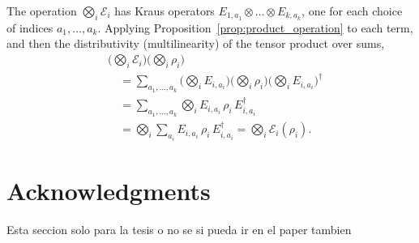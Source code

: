 \documentclass{ieeeaccess}
\begin{document}
\begin{IEEEproof}
  The operation $\bigotimes_i \mathcal{E}_i$ has Kraus operators $E_{1,a_1} \otimes \dots \otimes E_{k,a_k}$, one for each choice of indices $a_1, \dots, a_k$. Applying Proposition~\ref{prop:product_operation} to each term, and then the distributivity (multilinearity) of the tensor product over sums,
  \begin{align*}
    &\Big(\bigotimes_{i} \mathcal{E}_i\Big)\Big(\bigotimes_{i} \rho_i\Big) \\
    &\quad= \sum_{a_1, \dots, a_k} \Big(\bigotimes_{i} E_{i,a_i}\Big)\Big(\bigotimes_{i} \rho_i\Big)\Big(\bigotimes_{i} E_{i,a_i}\Big)^{\dagger} \\
    &\quad= \sum_{a_1, \dots, a_k} \bigotimes_{i} E_{i,a_i}\, \rho_i\, E_{i,a_i}^{\dagger} \\
    &\quad= \bigotimes_{i} \sum_{a_i} E_{i,a_i}\, \rho_i\, E_{i,a_i}^{\dagger}
    = \bigotimes_{i} \mathcal{E}_i(\rho_i).
  \end{align*}
\end{IEEEproof}

\clearpage
\section*{Acknowledgments}
\label{sec:acknowledgment}

Esta seccion solo para la tesis o no se si pueda ir en el paper tambien

\raggedright




\EOD
\end{document}
